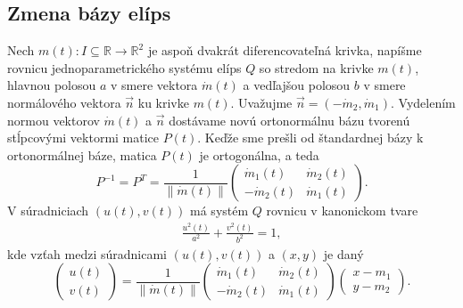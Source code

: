 \subsection{Zmena bázy elíps}
Nech $m(t) \colon  I \subseteq \mathbb{R} \rightarrow \mathbb{R}^2$ je aspoň dvakrát diferencovateľná krivka, napíšme rovnicu jednoparametrického systému elíps $Q$ so stredom na krivke $m(t)$, hlavnou polosou $a$ v smere vektora $\dot{m}(t)$ a vedľajšou polosou $b$ v smere normálového vektora $\vec{n}$ ku krivke $m(t)$. Uvažujme $\vec{n}=(-\dot{m}_2, \dot{m}_1). $ Vydelením normou vektorov $\dot{m}(t)$ a $\vec{n}$ dostávame novú ortonormálnu bázu tvorenú stĺpcovými vektormi matice $P(t).$ Keďže sme prešli od štandardnej bázy k ortonormálnej báze, matica $P(t)$ je ortogonálna, a teda
$$
P^{-1} = P^{T} = \frac{1}{ \| \dot{m}(t) \|} \left(\begin{matrix}
  \dot{m}_1(t) & \dot{m}_2(t) \\
  -\dot{m}_2(t) & \dot{m}_1(t)
\end{matrix}\right).
$$
V súradniciach $(u(t), v(t))$ má systém $Q$ rovnicu v kanonickom tvare 
\begin{align*}
\frac{u^2(t)}{a^2} + \frac{v^2(t)}{b^2} = 1,
\end{align*}
kde vzťah medzi súradnicami $(u(t), v(t))$ a $(x,y)$ je daný
$$
\left(\begin{matrix}
u(t) \\
v(t)
\end{matrix}\right) = \frac{1}{ \| \dot{m}(t) \|}
\left(\begin{matrix}
  \dot{m}_1(t) & \dot{m}_2(t) \\
   -\dot{m}_2(t) & \dot{m}_1(t)
\end{matrix}\right)
\left(\begin{matrix} x - m_1 \\ y - m_2 \end{matrix}\right).
$$
